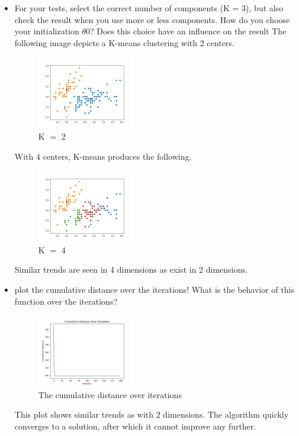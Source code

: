 \documentclass[a4paper]{article}
\begin{document}
\begin{itemize}
		\item For your tests, select the correct number of components (K = 3), but also check the result when you use more or less components. How do you choose your initialization $\theta$0? Does this choice have an inﬂuence on the result
		The following image depicts a K-means clustering with 2 centers.
	\begin{figure}[h]
		\begin{center}
			\includegraphics[width=0.4\textwidth]{kmeans_4dim_K2.png}
			\caption{K $=$ 2}
		\end{center}
	\end{figure}

	With 4 centers, K-means produces the following.
	\begin{figure}[h]
		\begin{center}
			\includegraphics[width=0.4\textwidth]{kmeans_4dim_K4.png}
			\caption{K $=$ 4}
		\end{center}
	\end{figure}

	Similar trends are seen in 4 dimensions as exist in 2 dimensions.

		\item plot the cumulative distance over the iterations! What is the behavior of this function over the iterations?

		\begin{figure}[h]
			\begin{center}
				\includegraphics[width=0.4\textwidth]{kmeans_4dim_conv.png}
				\caption{The cumulative distance over iterations}
			\end{center}
		\end{figure}
		This plot shows similar trends as with 2 dimensions.  The algorithm quickly converges to a solution, after which it cannot improve any further.\\


	\end{itemize}
\end{document}
